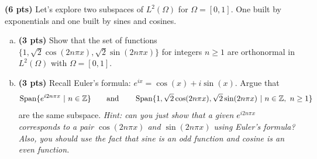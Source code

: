\documentclass[12pt]{article} %
\begin{document}
\newpage
\begin{problem}
\textbf{(6 pts)} Let's explore two subspaces of $L^2(\Omega)$ for $\Omega = [0,1]$. One built by exponentials and one built by sines and cosines.
	\begin{enumerate}[(a)]
		\item \textbf{(3 pts)} Show that the set of functions $\{1,\sqrt{2}\cos(2n \pi x), \sqrt{2}\sin(2n \pi x)\}$ for integers $n\geq 1$ are orthonormal in $L^2(\Omega)$ with $\Omega = [0,1]$.
		\item \textbf{(3 pts)} Recall Euler's formula: $e^{ix} = \cos(x)+i\sin(x)$.  Argue that 
\[
\operatorname{Span}\{e^{i2n\pi x} ~|~ n \in \mathbb{Z}\} \qquad \textrm{and} \qquad \operatorname{Span}\{1,\sqrt{2}\cos(2n \pi x), \sqrt{2}\sin(2n \pi x) ~|~ n \in \mathbb{Z}, ~ n\geq 1\}
\]
are the same subspace. \emph{Hint: can you just show that a given $e^{i2n\pi x}$ corresponds to a pair $\cos(2n \pi x)$ and $\sin(2n \pi x)$ using Euler's formula? Also, you should use the fact that sine is an odd function and cosine is an even function.}
	\end{enumerate}
\end{problem}
\end{document}
